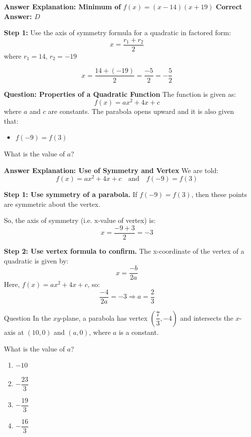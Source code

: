 \documentclass{beamer}
\begin{document}
\begin{frame}{\textbf{Answer Explanation: Minimum of } \( f(x) = (x - 14)(x + 19) \)}
    \textbf{Correct Answer: \(\boxed{D}\)}

    \vspace{0.1cm}
    \textbf{Step 1:} Use the axis of symmetry formula for a quadratic in factored form:
    \[
    x = \frac{r_1 + r_2}{2}
    \]
    where \( r_1 = 14 \), \( r_2 = -19 \)

    \[
    x = \frac{14 + (-19)}{2} = \frac{-5}{2} = -\frac{5}{2}
    \]

\end{frame}


\begin{frame}{\textbf{Question: Properties of a Quadratic Function}}
The function is given as:
\[
f(x) = ax^2 + 4x + c
\]
where \(a\) and \(c\) are constants. The parabola opens upward and it is also given that:
\begin{itemize}

    \item \(f(-9) = f(3)\)
\end{itemize}

What is the value of $a$?
\end{frame}


\begin{frame}{\textbf{Answer Explanation: Use of Symmetry and Vertex}}
We are told:
\[
f(x) = ax^2 + 4x + c
\quad \text{and} \quad f(-9) = f(3)
\]

\textbf{Step 1: Use symmetry of a parabola.}  
If \(f(-9) = f(3)\), then these points are symmetric about the vertex.

So, the axis of symmetry (i.e. x-value of vertex) is:
\[
x = \frac{-9 + 3}{2} = -3
\]

\textbf{Step 2: Use vertex formula to confirm.}  
The x-coordinate of the vertex of a quadratic is given by:
\[
x = \frac{-b}{2a}
\]
Here, \(f(x) = ax^2 + 4x + c\), so:
\[
\frac{-4}{2a} = -3 \Rightarrow a = \frac{2}{3}
\]


\end{frame}

\begin{frame}{Question}
In the $xy$-plane, a parabola has vertex $\left(\dfrac{7}{3}, -4\right)$ and intersects the $x$-axis at $(10, 0)$ and $(a, 0)$, where $a$ is a constant.

What is the value of $a$?

\begin{enumerate}
  \item[A)] $-10$
  \item[B)] $-\dfrac{23}{3}$
  \item[C)] $-\dfrac{19}{3}$
  \item[D)] $-\dfrac{16}{3}$
\end{enumerate}
\end{frame}
\end{document}
